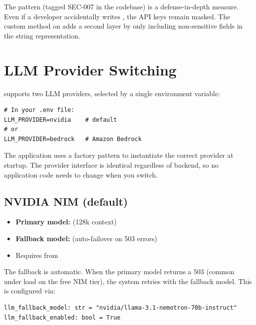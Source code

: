 \begin{keyinsight}
The  pattern (tagged SEC-007 in the codebase) is a defense-in-depth
measure.  Even if a developer accidentally writes
, the API keys remain masked.
The custom  method on  adds a second layer by only
including non-sensitive fields in the string representation.
\end{keyinsight}


\section{LLM Provider Switching}
\label{sec:llm-provider-switching}

\sysname{} supports two LLM providers, selected by a single environment
variable:

\begin{lstlisting}[style=bash, numbers=none]
# In your .env file:
LLM_PROVIDER=nvidia    # default
# or
LLM_PROVIDER=bedrock   # Amazon Bedrock
\end{lstlisting}

The application uses a factory pattern to instantiate the correct provider at
startup.  The provider interface is identical regardless of backend, so no
application code needs to change when you switch.

\subsection*{NVIDIA NIM (default)}

\begin{itemize}
    \item \textbf{Primary model:}
           (128k context)
    \item \textbf{Fallback model:}
           (auto-failover on 503 errors)
    \item Requires  from 
\end{itemize}

The fallback is automatic.  When the primary model returns a 503 (common under
load on the free NIM tier), the system retries with the fallback model.  This
is configured via:

\begin{lstlisting}[style=python, numbers=none]
llm_fallback_model: str = "nvidia/llama-3.1-nemotron-70b-instruct"
llm_fallback_enabled: bool = True
\end{lstlisting}

